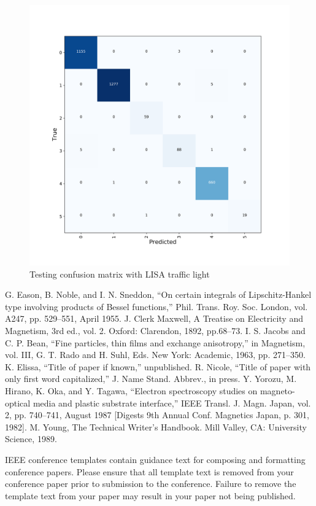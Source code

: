 \documentclass[conference]{IEEEtran}
\begin{document}
\begin{figure}[H]
\centering
  \begin{minipage}{.3\textwidth}
    \centering
    \includegraphics[width=1.0\linewidth]{confusion_matrix_traffic_light.png}
    \caption{Testing confusion matrix with LISA traffic light}
    \label{fig:fig_1}
  \end{minipage}
\end{figure}

\begin{thebibliography}{00}
 G. Eason, B. Noble, and I. N. Sneddon, ``On certain integrals of Lipschitz-Hankel type involving products of Bessel functions,'' Phil. Trans. Roy. Soc. London, vol. A247, pp. 529--551, April 1955.
 J. Clerk Maxwell, A Treatise on Electricity and Magnetism, 3rd ed., vol. 2. Oxford: Clarendon, 1892, pp.68--73.
 I. S. Jacobs and C. P. Bean, ``Fine particles, thin films and exchange anisotropy,'' in Magnetism, vol. III, G. T. Rado and H. Suhl, Eds. New York: Academic, 1963, pp. 271--350.
 K. Elissa, ``Title of paper if known,'' unpublished.
 R. Nicole, ``Title of paper with only first word capitalized,'' J. Name Stand. Abbrev., in press.
 Y. Yorozu, M. Hirano, K. Oka, and Y. Tagawa, ``Electron spectroscopy studies on magneto-optical media and plastic substrate interface,'' IEEE Transl. J. Magn. Japan, vol. 2, pp. 740--741, August 1987 [Digests 9th Annual Conf. Magnetics Japan, p. 301, 1982].
 M. Young, The Technical Writer's Handbook. Mill Valley, CA: University Science, 1989.
\end{thebibliography}
\vspace{12pt}
\color{red}
IEEE conference templates contain guidance text for composing and formatting conference papers. Please ensure that all template text is removed from your conference paper prior to submission to the conference. Failure to remove the template text from your paper may result in your paper not being published.
\end{document}
